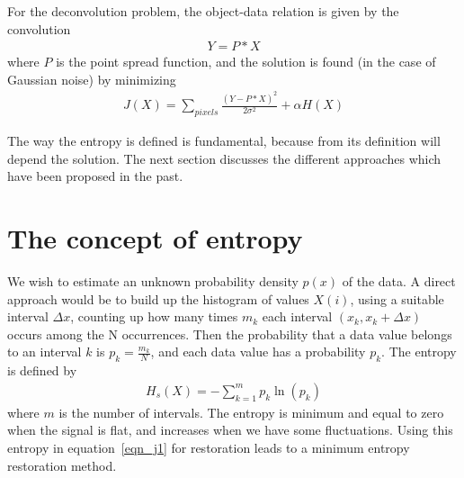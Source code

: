 \documentclass[11pt,a4paper]{article}
\begin{document}
For the deconvolution problem, the object-data relation is given by the
convolution
\begin{eqnarray}
Y = P * X
\end{eqnarray}
where $P$ is the point spread function, and the solution is found (in the case
of Gaussian noise) by minimizing
\begin{eqnarray}
J(X) = \sum_{pixels} \frac{{(Y-P*X)}^{2}}{2 {\sigma}^{2}} + {\alpha} H(X)
\end{eqnarray}

The way the entropy is defined is fundamental, because from its definition
will depend the solution. The next section discusses the different approaches 
which have been proposed in the past.

\section{The concept of entropy}
\label{sect_entr}

We wish to estimate an unknown probability density $p(x)$ of the data.
A direct approach would be to build up the histogram of values $X(i)$, using
a suitable interval $\Delta x$, counting up how many times $m_k$ each interval
$(x_k, x_k + \Delta x)$ occurs among the N occurrences. Then the probability
that a data value belongs to an interval $k$ is $p_k = \frac{m_k}{N}$, and
each data value has a probability $p_k$. The entropy is defined by
\begin{eqnarray}
H_s(X) = - \sum_{k=1}^{m} p_k \ln(p_k) 
\end{eqnarray}
where $m$ is the number of intervals.
The entropy is minimum and equal to zero when the signal is flat, and
increases when we have some fluctuations. Using this entropy in 
equation~\ref{eqn_j1} for restoration leads to a minimum entropy restoration
 method.
\end{document}
